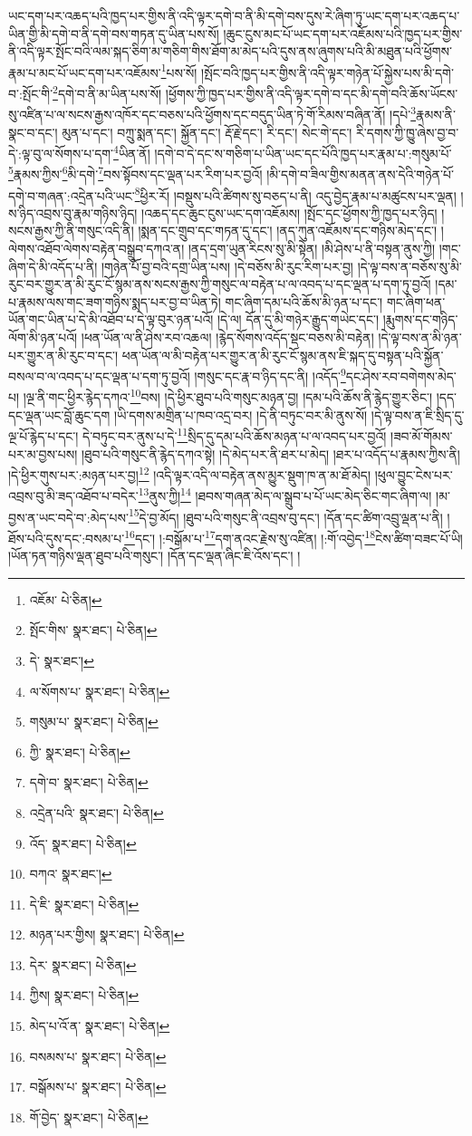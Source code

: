 ཡང་དག་པར་འཆད་པའི་ཁྱད་པར་གྱིས་ནི་འདི་ལྟར་དགེ་བ་ནི་མི་དགེ་བས་དུས་རེ་ཞིག་ཏུ་ཡང་དག་པར་འཆད་པ་ཡིན་གྱི་མི་དགེ་བ་ནི་དགེ་བས་གཏན་དུ་ཡིན་པས་སོ། །ཆུང་ངུས་མང་པོ་ཡང་དག་པར་འཇོམས་པའི་ཁྱད་པར་གྱིས་ནི་འདི་ལྟར་སྤོང་བའི་ལམ་སྐད་ཅིག་མ་གཅིག་གིས་ཐོག་མ་མེད་པའི་དུས་ནས་ཞུགས་པའི་མི་མཐུན་པའི་ཕྱོགས་རྣམ་པ་མང་པོ་ཡང་དག་པར་འཇོམས་\footnote{འཇོམ་  པེ་ཅིན། }པས་སོ། །སྤོང་བའི་ཁྱད་པར་གྱིས་ནི་འདི་ལྟར་གཉེན་པོ་སྐྱེས་པས་མི་དགེ་བ་:སྤོང་གི་\footnote{སྤོང་གིས་  སྣར་ཐང་།  པེ་ཅིན། }དགེ་བ་ནི་མ་ཡིན་པས་སོ། །ཕྱོགས་ཀྱི་ཁྱད་པར་གྱིས་ནི་འདི་ལྟར་དགེ་བ་དང་མི་དགེ་བའི་ཆོས་ཡོངས་སུ་འཛིན་པ་ལ་སངས་རྒྱས་འཁོར་དང་བཅས་པའི་ཕྱོགས་དང་བདུད་ཡིན་ཏེ་གོ་རིམས་བཞིན་ནོ། །དཔེ་\footnote{དེ་  སྣར་ཐང་། }རྣམས་ནི་སྣང་བ་དང་། མུན་པ་དང་། བཀྲུ་སྨན་དང་། སྐྱོན་དང་། རྡོ་རྗེ་དང་། རི་དང་། སེང་གེ་དང་། རི་དགས་ཀྱི་ཁྱུ་ཞེས་བྱ་བ་དེ་:ལྟ་བུ་ལ་སོགས་པ་དག་\footnote{ལ་སོགས་པ་  སྣར་ཐང་།  པེ་ཅིན། }ཡིན་ནོ། །དགེ་བ་དེ་དང་ས་གཅིག་པ་ཡིན་ཡང་དང་པོའི་ཁྱད་པར་རྣམ་པ་:གསུམ་པོ་\footnote{གསུམ་པ་  སྣར་ཐང་།  པེ་ཅིན། }རྣམས་ཀྱིས་\footnote{ཀྱི་  སྣར་ཐང་།  པེ་ཅིན། }མི་དགེ་\footnote{དགེ་བ་  སྣར་ཐང་།  པེ་ཅིན། }བས་སྟོབས་དང་ལྡན་པར་རིག་པར་བྱའོ། །མི་དགེ་བ་ཟིལ་གྱིས་མནན་ནས་དེའི་གཉེན་པོ་དགེ་བ་གཞན་:འདྲེན་པའི་ཡང་\footnote{འདྲེན་པའི་  སྣར་ཐང་།  པེ་ཅིན། }ཕྱིར་རོ། །བསྡུས་པའི་ཚིགས་སུ་བཅད་པ་ནི། འདུ་བྱེད་རྣམ་པ་མཚུངས་པར་ལྡན། །ས་ཉིད་འབྲས་བུ་རྣམ་གཉིས་ཉིད། །འཆད་དང་ཆུང་ངུས་ཡང་དག་འཇོམས། །སྤོང་དང་ཕྱོགས་ཀྱི་ཁྱད་པར་ཉིད། །སངས་རྒྱས་ཀྱི་ནི་གསུང་འདི་ནི། །སྨན་དང་གྲུབ་དང་གཏན་དུ་དང་། །ནད་ཀུན་འཇོམས་དང་གཉིས་མེད་དང་། །ལེགས་འཐོབ་ལེགས་བརྟེན་བསྒྲུབ་དཀའ་ན། །ནད་དྲག་ཡུན་རིངས་སུ་མི་སྟེན། །མི་ཤེས་པ་ནི་བསྟན་ནུས་ཀྱི། །གང་ཞིག་དེ་མི་འདོད་པ་ནི། །གཉེན་པོ་བྱ་བའི་དགྲ་ཡིན་པས། །དེ་བཅོས་མི་རུང་རིག་པར་བྱ། །དེ་ལྟ་བས་ན་བཅོས་སུ་མི་རུང་བར་གྱུར་ན་མི་རུང་ངོ་སྙམ་ནས་སངས་རྒྱས་ཀྱི་གསུང་ལ་བརྟེན་པ་ལ་འབད་པ་དང་ལྡན་པ་དག་ཏུ་བྱའོ། །དམ་པ་རྣམས་ལས་གང་ཟག་གཉིས་སྨད་པར་བྱ་བ་ཡིན་ཏེ། གང་ཞིག་དམ་པའི་ཆོས་མི་ཉན་པ་དང་། གང་ཞིག་ཕན་ཡོན་གང་ཡིན་པ་དེ་མི་འཐོབ་པ་དེ་ལྟ་བུར་ཉན་པའོ། །དེ་ལ། དོན་དུ་མི་གཉེར་རྒྱུད་གཡེང་དང་། །རྨུགས་དང་གཉིད་ལོག་མི་ཉན་པའོ། །ཕན་ཡོན་ལ་ནི་ཤེས་རབ་འཆལ། །རྙེད་སོགས་འདོད་སྡང་བཅས་མི་བརྟེན། །དེ་ལྟ་བས་ན་མི་ཉན་པར་གྱུར་ན་མི་རུང་བ་དང་། ཕན་ཡོན་ལ་མི་བརྟེན་པར་གྱུར་ན་མི་རུང་ངོ་སྙམ་ནས་ཇི་སྐད་དུ་བསྟན་པའི་སྐྱོན་བསལ་བ་ལ་འབད་པ་དང་ལྡན་པ་དག་ཏུ་བྱའོ། །གསུང་དང་རྣ་བ་ཉིད་དང་ནི། །འདོད་\footnote{འོད་  སྣར་ཐང་།  པེ་ཅིན། }དང་ཤེས་རབ་བགེགས་མེད་པ། །ལྔ་ནི་གང་ཕྱིར་རྙེད་དཀའ་\footnote{བཀའ་  སྣར་ཐང་། }བས། །དེ་ཕྱིར་ཐུབ་པའི་གསུང་མཉན་བྱ། །དམ་པའི་ཆོས་ནི་རྙེད་གྱུར་ཅིང་། །དད་དང་ལྡན་ཡང་བློ་ཆུང་དག །ཡི་དགས་མགྲིན་པ་ཁབ་འདྲ་བར། །དེ་ནི་བཏུང་བར་མི་ནུས་སོ། །དེ་ལྟ་བས་ན་ཇི་སྲིད་དུ་ལྔ་པོ་རྙེད་པ་དང་། དེ་བཏུང་བར་ནུས་པ་དེ་\footnote{དེ་ཇི་  སྣར་ཐང་།  པེ་ཅིན། }སྲིད་དུ་དམ་པའི་ཆོས་མཉན་པ་ལ་འབད་པར་བྱའོ། །ཟབ་མོ་གོམས་པར་མ་བྱས་པས། །ཐུབ་པའི་གསུང་ནི་རྙེད་དཀའ་སྟེ། །དེ་མེད་པར་ནི་ཐར་པ་མེད། །ཐར་པ་འདོད་པ་རྣམས་ཀྱིས་ནི། །དེ་ཕྱིར་གུས་པར་:མཉན་པར་བྱ།\footnote{མཉན་པར་གྱིས།  སྣར་ཐང་།  པེ་ཅིན། } །འདི་ལྟར་འདི་ལ་བརྟེན་ནས་མྱུར་སྡུག་ཁ་ན་མ་ཐོ་མེད། །ཕུལ་བྱུང་ངེས་པར་འབྲས་བུ་མི་ཟད་འཐོབ་པ་བདེར་\footnote{དེར་  སྣར་ཐང་།  པེ་ཅིན། }ནུས་ཀྱི།\footnote{ཀྱིས།  སྣར་ཐང་།  པེ་ཅིན། } །ཐབས་གཞན་མེད་ལ་སྒྲུབ་པ་པོ་ཡང་མེད་ཅིང་གང་ཞིག་ལ། །མ་བྱས་ན་ཡང་བདེ་བ་:མེད་པས་\footnote{མེད་པ་འོ་ན་  སྣར་ཐང་།  པེ་ཅིན། }དེ་བྱ་མོད། །ཐུབ་པའི་གསུང་ནི་འབྲས་བུ་དང་། །དོན་དང་ཚིག་འབྲུ་ལྡན་པ་ནི། །ཐོས་པའི་དུས་དང་:བསམ་པ་\footnote{བསམས་པ་  སྣར་ཐང་།  པེ་ཅིན། }དང་། །:བསྒོམ་པ་\footnote{བསྒོམས་པ་  སྣར་ཐང་།  པེ་ཅིན། }དག་ནའང་རྗེས་སུ་འཛིན། །:གོ་འབྱེད་\footnote{གོ་བྱེད་  སྣར་ཐང་།  པེ་ཅིན། }ངེས་ཚིག་བཟང་པོ་ཡི། །ཡོན་ཏན་གཉིས་ལྡན་ཐུབ་པའི་གསུང་། །དོན་དང་ལྡན་ཞིང་ཇི་འོས་དང་། །
